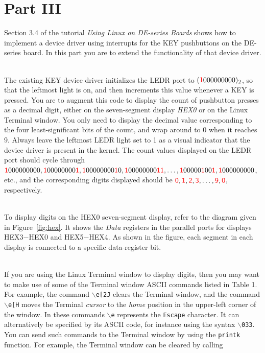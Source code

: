 \documentclass[epsfig,10pt,fullpage]{article}
\begin{document}
\section*{Part III}
\noindent
Section 3.4 of the tutorial \textit{Using Linux on DE-series Boards} shows how to implement a 
device driver using interrupts for the KEY pushbuttons on the DE-series board. In this part you 
are to extend the functionality of that device driver.

~\\
\noindent
The existing KEY device driver initializes the LEDR port to $({\color{red}\sf{1}}000000000)_2$, so that the 
leftmost light is on, and then increments this value whenever a KEY is pressed. You are to 
augment this code to display the count of pushbutton presses as a decimal digit, either on 
the seven-segment display {\it HEX0} or on the Linux Terminal window. You only need to 
display the decimal value corresponding to the four 
least-significant bits of the count, and wrap around to 0 when it reaches 9. Always
leave the leftmost LEDR light set to 1 as a visual indicator that the device driver 
is present in the kernel. The count values displayed on the LEDR port should cycle through 
${\color{red}\sf{1}}000000000, {\color{red}\sf{1}}00000000{\color{red}\sf{1}}, {\color{red}\sf{1}}00000000{\color{red}\sf{1}}0,
{\color{red}\sf{1}}00000000{\color{red}\sf{11}}, \ldots, {\color{red}\sf{1}}00000{\color{red}\sf{1}}00{\color{red}\sf{1}}, {\color{red}\sf{1}}000000000$, etc., and the 
corresponding digits displayed should be ${\color{red}\sf{0}}, {\color{red}\sf{1}}, {\color{red}\sf{2}}, {\color{red}\sf{3}}, \ldots, {\color{red}\sf{9}},
{\color{red}\sf{0}}$, 
respectively. 

~\\
\noindent
To display digits on the HEX0 seven-segment display, refer to the diagram given in 
Figure~\ref{fig:hex}. It shows the {\it Data} registers in the parallel ports for displays
HEX3$-$HEX0 and HEX5$-$HEX4. As shown in the figure, each segment in each display is
connected to a specific data-register bit. 

~\\
\noindent
If you are using the Linux Terminal window to display digits, then you may want to make 
use of some of the Terminal
window ASCII commands listed in Table 1. For example, the command \texttt{$\backslash$e[2J} clears 
the Terminal window, and the command \texttt{$\backslash$e[H} moves the Terminal {\it cursor} 
to the {\it home} position in the upper-left corner of the window.  In these 
commands \texttt{$\backslash$e} represents the \texttt{Escape} character. It can alternatively 
be specified by its ASCII code, for instance using the syntax \texttt{$\backslash$033}. You can send
such commands to the Terminal window by using the \texttt{printk} function. For example,
the Terminal window can be cleared by calling 
\end{document}
